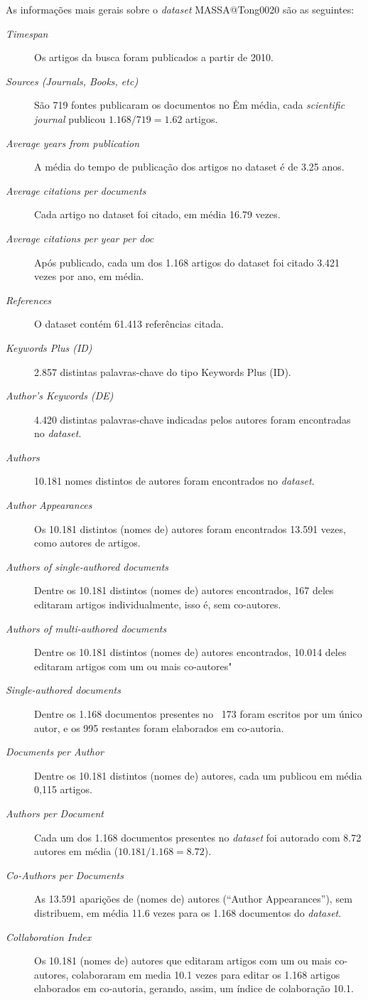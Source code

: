As informações mais gerais sobre o \textit{dataset} MASSA@Tong0020 são as seguintes:
\begin{description}
    \item[\textit{Timespan}] Os artigos da busca foram publicados a partir de 2010.
    \item [\textit{Sources (Journals, Books, etc)}] São 719 fontes publicaram os documentos no \dataset\. Em média, cada \textit{scientific journal} publicou $1.168/719=1.62$ artigos.%
     \item [\textit{Average years from publication}] A média do tempo de publicação dos artigos no dataset é de 3.25 anos.
     \item [\textit{Average citations per documents}] Cada artigo no dataset foi citado, em média 16.79 vezes.
     \item [\textit{Average citations per year per doc}] Após publicado, cada um dos 1.168 artigos do dataset foi citado 3.421 vezes por ano, em média.
    \item [\textit{References}] O dataset contém 61.413 referências citada.
    \item [\textit{Keywords Plus (ID)}] 2.857 distintas palavras-chave do tipo Keywords Plus (ID).
    \item [\textit{Author's Keywords (DE)}] 4.420 distintas palavras-chave indicadas pelos autores foram encontradas no \textit{dataset}.
     \item [\textit{Authors}] 10.181 nomes distintos de autores foram encontrados no \textit{dataset}.
    \item [\textit{Author Appearances}] Os 10.181 distintos (nomes de) autores foram encontrados 13.591 vezes, como autores de artigos.
    \item [\textit{Authors of single-authored documents}] Dentre os 10.181 distintos (nomes de) autores encontrados, 167 deles editaram artigos individualmente, isso é, sem co-autores.
    \item [\textit{Authors of multi-authored documents}] Dentre os 10.181 distintos (nomes de) autores encontrados, 10.014 deles editaram artigos com um ou mais co-autores"
    \item [\textit{Single-authored documents}] Dentre os 1.168 documentos presentes no \dataset\, 173 foram escritos por um único autor, e os 995 restantes foram elaborados em co-autoria.
    \item [\textit{Documents per Author}] Dentre os 10.181 distintos (nomes de) autores, cada um publicou em média 0,115 artigos.
    \item [\textit{Authors per Document}] Cada um dos 1.168 documentos presentes no \textit{dataset}  foi autorado com 8.72 autores em média ($10.181 / 1.168 = 8.72$).
    \item [\textit{Co-Authors per Documents}] As 13.591 aparições de (nomes de) autores (``Author Appearances''), sem distribuem, em média 11.6 vezes para os 1.168 documentos do \textit{dataset}.
    \item [\textit{Collaboration Index}] Os 10.181 (nomes de) autores que editaram artigos com um ou mais co-autores, colaboraram em media 10.1 vezes para editar os 1.168 artigos elaborados em co-autoria, gerando, assim, um índice de colaboração 10.1. 
    

\end{description}
